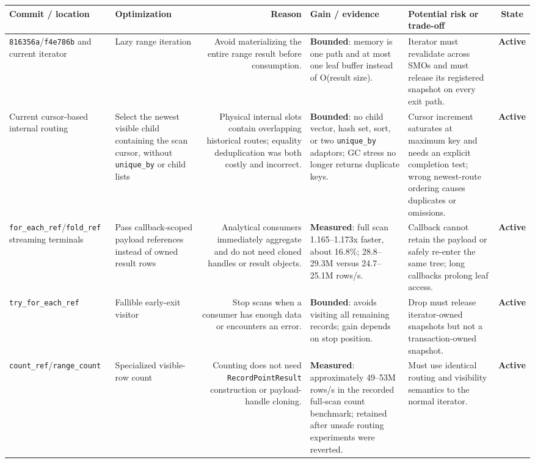 \documentclass[10pt,a4paper,landscape]{article}
\newcommand{\code}[1]{\texttt{#1}}
\newcommand{\commit}[1]{\code{#1}}
\newcommand{\gainmeasured}{\textbf{Measured}}
\newcommand{\gainbounded}{\textbf{Bounded}}
\newcommand{\stateactive}{\textbf{Active}}
\begin{document}
\begin{longtable}{IORGKS}
\toprule
\textbf{Commit / location} & \textbf{Optimization} & \textbf{Reason} &
\textbf{Gain / evidence} & \textbf{Potential risk or trade-off} & \textbf{State} \\
\midrule
\endhead
\commit{816356a}/\commit{f4e786b} and current iterator & Lazy range iteration & Avoid
materializing the entire range result before consumption. & \gainbounded: memory is one path
and at most one leaf buffer instead of O(result size). & Iterator must revalidate across
SMOs and must release its registered snapshot on every exit path. & \stateactive \\

Current cursor-based internal routing & Select the newest visible child containing the
scan cursor, without \code{unique\_by} or child lists & Physical internal slots contain
overlapping historical routes; equality deduplication was both costly and incorrect. &
\gainbounded: no child vector, hash set, sort, or two \code{unique\_by} adaptors; GC stress no
longer returns duplicate keys. & Cursor increment saturates at maximum key and needs an
explicit completion test; wrong newest-route ordering causes duplicates or omissions. &
\stateactive \\

\code{for\_each\_ref}/\code{fold\_ref} streaming terminals & Pass callback-scoped payload
references instead of owned result rows & Analytical consumers immediately aggregate and
do not need cloned handles or result objects. & \gainmeasured: full scan 1.165--1.173x faster,
about 16.8\%; 28.8--29.3M versus 24.7--25.1M rows/s. & Callback cannot retain the payload
or safely re-enter the same tree; long callbacks prolong leaf access. & \stateactive \\

\code{try\_for\_each\_ref} & Fallible early-exit visitor & Stop scans when a consumer has
enough data or encounters an error. & \gainbounded: avoids visiting all remaining records;
gain depends on stop position. & Drop must release iterator-owned snapshots but not a
transaction-owned snapshot. & \stateactive \\

\code{count\_ref}/\code{range\_count} & Specialized visible-row count & Counting does not
need \code{RecordPointResult} construction or payload-handle cloning. & \gainmeasured:
approximately 49--53M rows/s in the recorded full-scan count benchmark; retained after
unsafe routing experiments were reverted. & Must use identical routing and visibility
semantics to the normal iterator. & \stateactive \\


\end{longtable}
\end{document}
